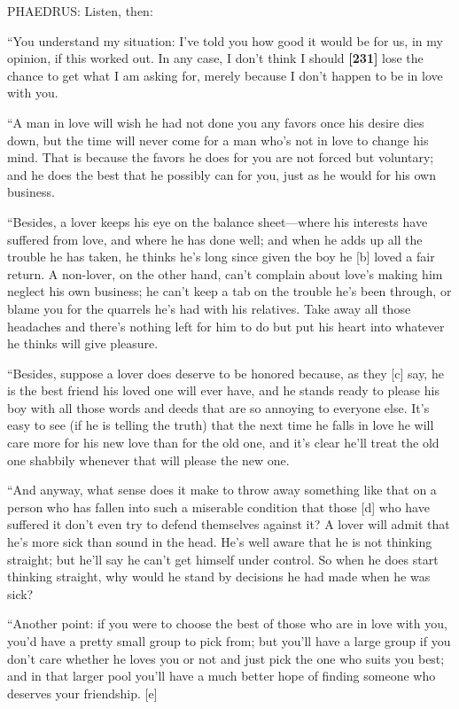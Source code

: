 PHAEDRUS: Listen, then:

“You understand my situation: I've told you how good it would be for us,
in my opinion, if this worked out. In any case, I don't think I should
{\bf {[}231{]}} lose the chance to get what I am asking for, merely
because I don't happen to be in love with you.

“A man in love will wish he had not done you any favors once his desire
dies down, but the time will never come for a man who's not in love to
change his mind. That is because the favors he does for you are not
forced but voluntary; and he does the best that he possibly can for you,
just as he would for his own business.

“Besides, a lover keeps his eye on the balance sheet---where his
interests have suffered from love, and where he has done well; and when
he adds up all the trouble he has taken, he thinks he's long since given
the boy he {[}b{]} loved a fair return. A non-lover, on the other hand,
can't complain about love's making him neglect his own business; he
can't keep a tab on the trouble he's been through, or blame you for the
quarrels he's had with his relatives. Take away all those headaches and
there's nothing left for him to do but put his heart into whatever he
thinks will give pleasure.

“Besides, suppose a lover does deserve to be honored because, as they
{[}c{]} say, he is the best friend his loved one will ever have, and he
stands ready to please his boy with all those words and deeds that are
so annoying to everyone else. It's easy to see (if he is telling the
truth) that the next time he falls in love he will care more for his new
love than for the old one, and it's clear he'll treat the old one
shabbily whenever that will please the new one.

“And anyway, what sense does it make to throw away something like that
on a person who has fallen into such a miserable condition that those
{[}d{]} who have suffered it don't even try to defend themselves against
it? A lover will admit that he's more sick than sound in the head. He's
well aware that he is not thinking straight; but he'll say he can't get
himself under control. So when he does start thinking straight, why
would he stand by decisions he had made when he was sick?

“Another point: if you were to choose the best of those who are in love
with you, you'd have a pretty small group to pick from; but you'll have
a large group if you don't care whether he loves you or not and just
pick the one who suits you best; and in that larger pool you'll have a
much better hope of finding someone who deserves your friendship.
{[}e{]}

